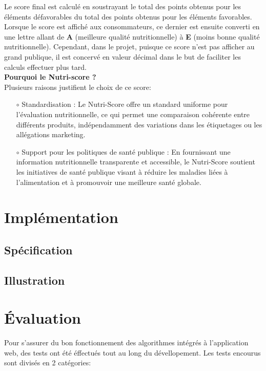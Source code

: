 \documentclass[11pt]{article}
\begin{document}
Le score final est calculé en soustrayant le total des points obtenus pour les éléments défavorables du total des points obtenus pour les éléments favorables. Lorsque le score est affiché aux consommateurs, ce dernier est ensuite converti en une lettre allant de \textbf{A} (meilleure qualité nutritionnelle) à \textbf{E} (moins bonne qualité nutritionnelle). Cependant, dans le projet, puisque ce score n'est pas afficher au grand publique, il est concervé en valeur décimal dans le but de faciliter les calculs effectuer plus tard.\\

\textbf{Pourquoi le Nutri-score ?}\\

Plusieurs raisons justifient le choix de ce score:\\

\begin{itemize}

    \item[$\circ$] Standardisation : Le Nutri-Score offre un standard uniforme pour l'évaluation nutritionnelle, ce qui permet une comparaison cohérente entre différents produits, indépendamment des variations dans les étiquetages ou les allégations marketing.\\

    \item[$\circ$] Support pour les politiques de santé publique : En fournissant une information nutritionnelle transparente et accessible, le Nutri-Score soutient les initiatives de santé publique visant à réduire les maladies liées à l'alimentation et à promouvoir une meilleure santé globale.
\end{itemize}


\newpage
\section{Implémentation}
\label{implementation}
\subsection{Spécification}
\subsection{Illustration}

\newpage
\section{Évaluation}
Pour s'assurer du bon fonctionnement des algorithmes intégrés à l'application web, des tests ont été éffectués tout au long du dévellopement. Les tests encourus sont divisés en 2 catégories:\\
\end{document}
